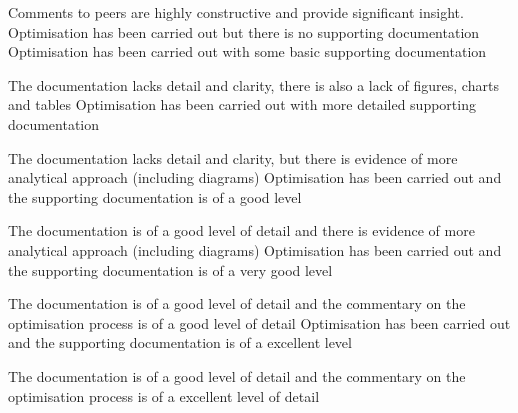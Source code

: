 \documentclass{../../fal_assignment}
\begin{document}
\begin{markingrubric}
		\par Comments to peers are highly constructive and provide significant insight.
%
		\grade\fail Optimisation has been carried out but there is no supporting documentation
		\grade Optimisation has been carried out with some basic supporting documentation
		\par The documentation lacks detail and clarity, there is also a lack of figures, charts and tables
		\grade Optimisation has been carried out with more detailed supporting documentation
		\par The documentation lacks detail and clarity, but there is evidence of more analytical approach (including diagrams)
		\grade Optimisation has been carried out and the supporting documentation is of a good level
		\par The documentation is of a good level of detail and there is evidence of more analytical approach (including diagrams)
		\grade Optimisation has been carried out and the supporting documentation is of a very good level
		\par The documentation is of a good level of detail and the commentary on the optimisation process is of a good level of detail
		\grade Optimisation has been carried out and the supporting documentation is of a excellent level
		\par The documentation is of a good level of detail and the commentary on the optimisation process is of a excellent level of detail
\end{markingrubric}
\end{document}
